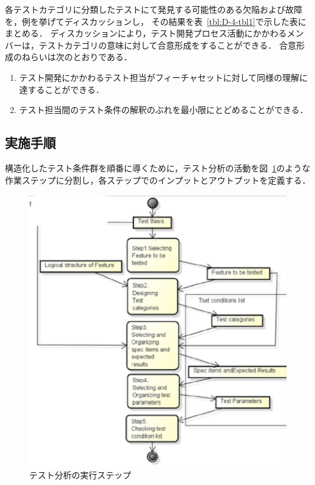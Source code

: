 各テストカテゴリに分類したテストにて発見する可能性のある欠陥および故障を，例を挙げてディスカッションし，
その結果を表~\ref{tbl:D-4-tbl1}で示した表にまとめる．
ディスカッションにより，テスト開発プロセス活動にかかわるメンバーは，テストカテゴリの意味に対して合意形成をすることができる．
合意形成のねらいは次のとおりである．

\begin{enumerate}
\item テスト開発にかかわるテスト担当がフィーチャセットに対して同様の理解に達することができる．
\item テスト担当間のテスト条件の解釈のぶれを最小限にとどめることができる．
\end{enumerate}


\subsection{実施手順}
構造化したテスト条件群を順番に導くために，テスト分析の活動を図~\ref{fig:D-4-Fig3}のような作業ステップに分割し，各ステップでのインプットとアウトプットを定義する．


\begin{figure}[htbp]
  \begin{center}
  \includegraphics[width=12cm]{./image/D-4-Fig3.png}
  \caption{テスト分析の実行ステップ}
  \label{fig:D-4-Fig3}
  \end{center}
   \end{figure}


